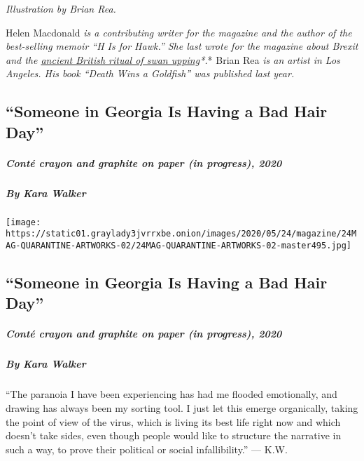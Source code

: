 \emph{Illustration by Brian Rea.}

Helen Macdonald \emph{\emph{is a contributing writer for the magazine
and the author of the best-selling memoir ``H Is for Hawk.'' She last
wrote for the magazine about Brexit and the}
\href{https://www.nytimes3xbfgragh.onion/2017/01/05/magazine/in-search-of-post-brexit-england-and-swans.html}{ancient
British ritual of swan upping}*.}* Brian Rea \emph{is an artist in Los
Angeles. His book ``Death Wins a Goldfish'' was published last year.}

\hypertarget{someone-in-georgia-is-having-a-bad-hair-day}{%
\subsection{``Someone in Georgia Is Having a Bad Hair
Day''}\label{someone-in-georgia-is-having-a-bad-hair-day}}

\hypertarget{contuxe9-crayon-and-graphite-on-paper-in-progress-2020}{%
\subparagraph{Conté crayon and graphite on paper (in progress),
2020}\label{contuxe9-crayon-and-graphite-on-paper-in-progress-2020}}

\hypertarget{by-kara-walker}{%
\subparagraph{By Kara Walker}\label{by-kara-walker}}

\texttt{[image: https://static01.graylady3jvrrxbe.onion/images/2020/05/24/magazine/24MAG-QUARANTINE-ARTWORKS-02/24MAG-QUARANTINE-ARTWORKS-02-master495.jpg]}

\hypertarget{someone-in-georgia-is-having-a-bad-hair-day-1}{%
\subsection{``Someone in Georgia Is Having a Bad Hair
Day''}\label{someone-in-georgia-is-having-a-bad-hair-day-1}}

\hypertarget{contuxe9-crayon-and-graphite-on-paper-in-progress-2020-1}{%
\subparagraph{Conté crayon and graphite on paper (in progress),
2020}\label{contuxe9-crayon-and-graphite-on-paper-in-progress-2020-1}}

\hypertarget{by-kara-walker-1}{%
\subparagraph{By Kara Walker}\label{by-kara-walker-1}}

``The paranoia I have been experiencing has had me flooded emotionally,
and drawing has always been my sorting tool. I just let this emerge
organically, taking the point of view of the virus, which is living its
best life right now and which doesn't take sides, even though people
would like to structure the narrative in such a way, to prove their
political or social infallibility.'' --- K.W.

